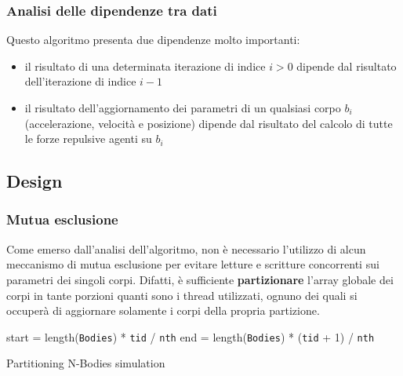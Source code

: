 \documentclass[report]{subfiles}
\begin{document}
	\subsubsection{Analisi delle dipendenze tra dati}
	\label{sec:dipendenze}
	Questo algoritmo presenta due dipendenze molto importanti:
	\begin{itemize}
		\item il risultato di una determinata iterazione di indice $i > 0$ dipende dal risultato dell'iterazione di indice $i-1$
		\item il risultato dell'aggiornamento dei parametri di un qualsiasi corpo $b_i$ (accelerazione, velocità e posizione) dipende dal risultato del calcolo di tutte le forze repulsive agenti su $b_i$
	\end{itemize}
	
	\subsection{Design}
	\subsubsection{Mutua esclusione}
	Come emerso dall'analisi dell'algoritmo, non è necessario l'utilizzo di alcun meccanismo di mutua esclusione per evitare letture e scritture concorrenti sui parametri dei singoli corpi. Difatti, è sufficiente \textbf{partizionare} l'array globale dei corpi in tante porzioni quanti sono i thread utilizzati, ognuno dei quali si occuperà di aggiornare solamente i corpi della propria partizione.
	
	\begin{algorithm}
		
		start = length(\texttt{Bodies}) * \texttt{tid} / \texttt{nth}\;
		end = length(\texttt{Bodies}) * (\texttt{tid} + 1) / \texttt{nth}\;
		\caption{Partitioning N-Bodies simulation}
		\label{alg:sim-partition}
	\end{algorithm}
	
\end{document}
